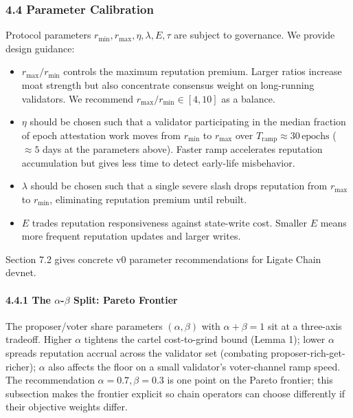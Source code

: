 \documentclass[
  11pt,
]{article}
\providecommand{\tightlist}{%
  \setlength{\itemsep}{0pt}\setlength{\parskip}{0pt}}
\begin{document}
\subsubsection{4.4 Parameter Calibration}\label{parameter-calibration}

Protocol parameters \(r_{\min}, r_{\max}, \eta, \lambda, E, \tau\) are
subject to governance. We provide design guidance:

\begin{itemize}
\tightlist
\item
  \(r_{\max} / r_{\min}\) controls the maximum reputation premium.
  Larger ratios increase moat strength but also concentrate consensus
  weight on long-running validators. We recommend
  \(r_{\max} / r_{\min} \in [4, 10]\) as a balance.
\item
  \(\eta\) should be chosen such that a validator participating in the
  median fraction of epoch attestation work moves from \(r_{\min}\) to
  \(r_{\max}\) over \(T_{\text{ramp}} \approx 30\,\text{epochs}\)
  (\(\approx 5\) days at the parameters above). Faster ramp accelerates
  reputation accumulation but gives less time to detect early-life
  misbehavior.
\item
  \(\lambda\) should be chosen such that a single severe slash drops
  reputation from \(r_{\max}\) to \(r_{\min}\), eliminating reputation
  premium until rebuilt.
\item
  \(E\) trades reputation responsiveness against state-write cost.
  Smaller \(E\) means more frequent reputation updates and larger
  writes.
\end{itemize}

Section 7.2 gives concrete v0 parameter recommendations for Ligate Chain
devnet.

\paragraph{\texorpdfstring{4.4.1 The \(\alpha\)-\(\beta\) Split: Pareto
Frontier}{4.4.1 The \textbackslash alpha-\textbackslash beta Split: Pareto Frontier}}\label{the-alpha-beta-split-pareto-frontier}

The proposer/voter share parameters \((\alpha, \beta)\) with
\(\alpha + \beta = 1\) sit at a three-axis tradeoff. Higher \(\alpha\)
tightens the cartel cost-to-grind bound (Lemma 1); lower \(\alpha\)
spreads reputation accrual across the validator set (combating
proposer-rich-get-richer); \(\alpha\) also affects the floor on a small
validator's voter-channel ramp speed. The recommendation
\(\alpha = 0.7, \beta = 0.3\) is one point on the Pareto frontier; this
subsection makes the frontier explicit so chain operators can choose
differently if their objective weights differ.
\end{document}
